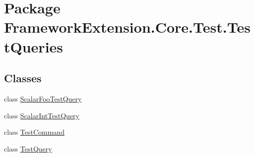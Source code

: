 \hypertarget{namespace_framework_extension_1_1_core_1_1_test_1_1_test_queries}{\section{Package Framework\-Extension.\-Core.\-Test.\-Test\-Queries}
\label{namespace_framework_extension_1_1_core_1_1_test_1_1_test_queries}
}
\subsection*{Classes}
\begin{DoxyCompactItemize}
\item 
class \hyperlink{class_framework_extension_1_1_core_1_1_test_1_1_test_queries_1_1_scalar_foo_test_query}{Scalar\-Foo\-Test\-Query}
\item 
class \hyperlink{class_framework_extension_1_1_core_1_1_test_1_1_test_queries_1_1_scalar_int_test_query}{Scalar\-Int\-Test\-Query}
\item 
class \hyperlink{class_framework_extension_1_1_core_1_1_test_1_1_test_queries_1_1_test_command}{Test\-Command}
\item 
class \hyperlink{class_framework_extension_1_1_core_1_1_test_1_1_test_queries_1_1_test_query}{Test\-Query}
\end{DoxyCompactItemize}
